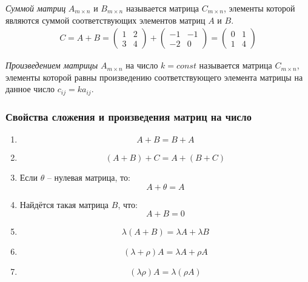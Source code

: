 \begin{definition}
  \textit{Суммой матриц} $A_{m \times n}$ и $B_{m \times n}$ называется матрица $C_{m \times n}$, элементы которой являются суммой соответствующих элементов матриц $A$ и $B$.
  \begin{gather*}
    C = A + B = \begin{pmatrix}
      1 & 2 \\
      3 & 4
    \end{pmatrix}
    +
    \begin{pmatrix}
      -1 & -1 \\
      -2 & 0
    \end{pmatrix}
    =
    \begin{pmatrix}
      0 & 1 \\
      1 & 4
    \end{pmatrix}
  \end{gather*}
\end{definition}

\begin{definition}
  \textit{Произведением матрицы} $A_{m \times n}$ на число $k = const$ называется матрица $C_{m \times n}$, элементы которой равны произведению соответствующего элемента матрицы на данное число $c_{ij} = k a_{ij}$.
\end{definition}

\subsubsection{Свойства сложения и произведения матриц на число}

\begin{enumerate}
  \item \[
    A + B = B + A
  \] 

  \item \[
   (A + B) + C = A + (B + C)
  \]

  \item Если $\theta$ -- нулевая матрица, то: \[
    A + \theta = A
  \] 

  \item Найдётся такая матрица $B$, что:  \[
    A + B = 0
  \]  

  \item \[
  \lambda (A + B) = \lambda A + \lambda B
  \] 

  \item \[
      (\lambda + \rho) A = \lambda A + \rho A
  \] 

 \item \[
    (\lambda \rho) A = \lambda (\rho A)
 \] 
\end{enumerate}


